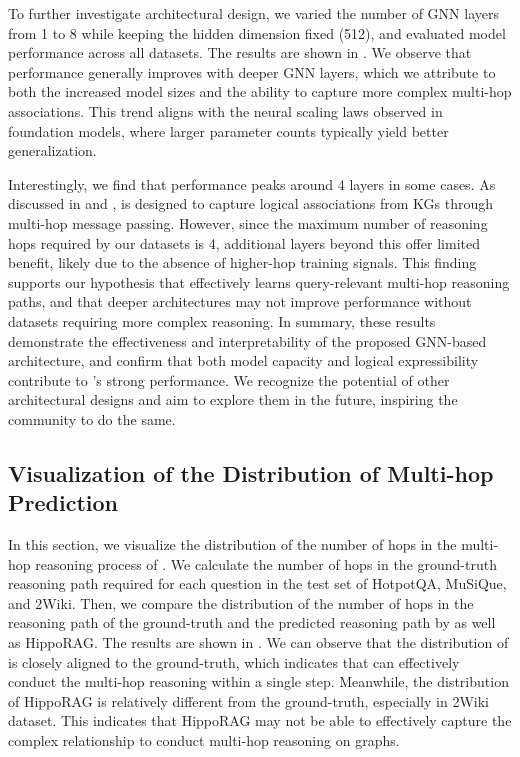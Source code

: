 To further investigate architectural design, we varied the number of GNN layers from 1 to 8 while keeping the hidden dimension fixed (512), and evaluated model performance across all datasets. The results are shown in . We observe that performance generally improves with deeper GNN layers, which we attribute to both the increased model sizes and the ability to capture more complex multi-hop associations. This trend aligns with the neural scaling laws observed in foundation models, where larger parameter counts typically yield better generalization.

Interestingly, we find that performance peaks around 4 layers in some cases. As discussed in  and , \ourmethod is designed to capture logical associations from KGs through multi-hop message passing. However, since the maximum number of reasoning hops required by our datasets is 4, additional layers beyond this offer limited benefit, likely due to the absence of higher-hop training signals. This finding supports our hypothesis that \ourmethod effectively learns query-relevant multi-hop reasoning paths, and that deeper architectures may not improve performance without datasets requiring more complex reasoning.
In summary, these results demonstrate the effectiveness and interpretability of the proposed GNN-based architecture, and confirm that both model capacity and logical expressibility contribute to \ourmethod’s strong performance. We recognize the potential of other architectural designs and aim to explore them in the future, inspiring the community to do the same.





\subsection{Visualization of the Distribution of Multi-hop Prediction}\label{app:multi_hop}
In this section, we visualize the distribution of the number of hops in the multi-hop reasoning process of \ourmethod. We calculate the number of hops in the ground-truth reasoning path required for each question in the test set of HotpotQA, MuSiQue, and 2Wiki. Then, we compare the distribution of the number of hops in the reasoning path of the ground-truth and the predicted reasoning path by \ourmethod as well as HippoRAG.
%
The results are shown in . We can observe that the distribution of \ourmethod is closely aligned to the ground-truth, which indicates that \ourmethod can effectively conduct the multi-hop reasoning within a single step. Meanwhile, the distribution of HippoRAG is relatively different from the ground-truth, especially in 2Wiki dataset. This indicates that HippoRAG may not be able to effectively capture the complex relationship to conduct multi-hop reasoning on graphs.

